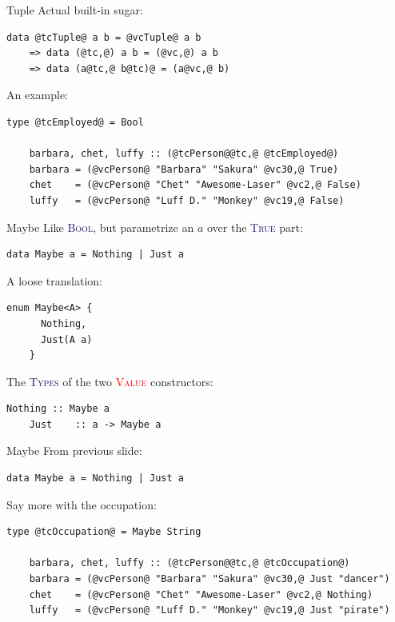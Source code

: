 \documentclass[xcolor={usenames,dvipsnames}]{beamer}
\newcommand{\htycon}[1]{\textcolor{MidnightBlue}{\textsc{#1}}}
\newcommand{\hvalcon}[1]{\textcolor{Red}{\textsc{#1}}}
\begin{document}
\begin{frame}[fragile]{Tuple}
  Actual built-in sugar:
  \begin{lstlisting}[style=hask]
       data @tcTuple@ a b = @vcTuple@ a b
    => data (@tc,@) a b = (@vc,@) a b
    => data (a@tc,@ b@tc)@ = (a@vc,@ b)
  \end{lstlisting}

  \pause
  An example:
  \begin{lstlisting}[style=hask]
    type @tcEmployed@ = Bool

    barbara, chet, luffy :: (@tcPerson@@tc,@ @tcEmployed@)
    barbara = (@vcPerson@ "Barbara" "Sakura" @vc30,@ True)
    chet    = (@vcPerson@ "Chet" "Awesome-Laser" @vc2,@ False)
    luffy   = (@vcPerson@ "Luff D." "Monkey" @vc19,@ False)
  \end{lstlisting}
\end{frame}

\begin{frame}[fragile]{Maybe}
  Like \htycon{Bool}, but parametrize an $a$ over the \htycon{True} part:
  \begin{lstlisting}[style=hask]
    data Maybe a = Nothing | Just a
  \end{lstlisting}

  \pause
  A loose translation:
  \begin{lstlisting}[style=hask]
    enum Maybe<A> {
      Nothing,
      Just(A a)
    }
  \end{lstlisting}

  \pause
  The \htycon{Types} of the two \hvalcon{Value} constructors:
  \begin{lstlisting}[style=hask]
    Nothing :: Maybe a
    Just    :: a -> Maybe a
  \end{lstlisting}
\end{frame}

\begin{frame}[fragile]{Maybe}
  From previous slide:
  \begin{lstlisting}[style=hask]
    data Maybe a = Nothing | Just a
  \end{lstlisting}

  \pause
  Say more with the occupation:
  \begin{lstlisting}[style=hask]
    type @tcOccupation@ = Maybe String

    barbara, chet, luffy :: (@tcPerson@@tc,@ @tcOccupation@)
    barbara = (@vcPerson@ "Barbara" "Sakura" @vc30,@ Just "dancer")
    chet    = (@vcPerson@ "Chet" "Awesome-Laser" @vc2,@ Nothing)
    luffy   = (@vcPerson@ "Luff D." "Monkey" @vc19,@ Just "pirate")
  \end{lstlisting}
\end{frame}
\end{document}
